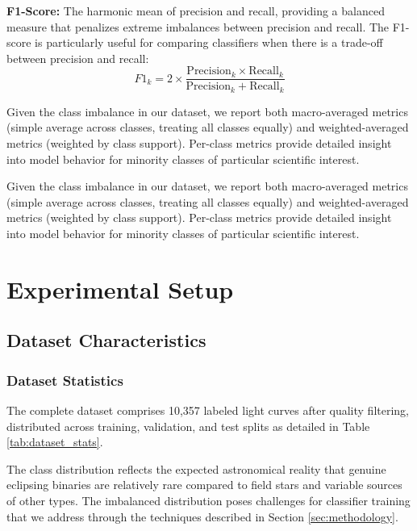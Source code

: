 \documentclass[11pt,a4paper]{article}
\begin{document}
\textbf{F1-Score:} The harmonic mean of precision and recall, providing a balanced measure that penalizes extreme imbalances between precision and recall. The F1-score is particularly useful for comparing classifiers when there is a trade-off between precision and recall:
\begin{equation}
    F1_k = 2 \times \frac{\text{Precision}_k \times \text{Recall}_k}{\text{Precision}_k + \text{Recall}_k}
\end{equation}

Given the class imbalance in our dataset, we report both macro-averaged metrics (simple average across classes, treating all classes equally) and weighted-averaged metrics (weighted by class support). Per-class metrics provide detailed insight into model behavior for minority classes of particular scientific interest.

Given the class imbalance in our dataset, we report both macro-averaged metrics (simple average across classes, treating all classes equally) and weighted-averaged metrics (weighted by class support). Per-class metrics provide detailed insight into model behavior for minority classes of particular scientific interest.

\section{Experimental Setup}\label{sec:experiments}

\subsection{Dataset Characteristics}

\subsubsection{Dataset Statistics}

The complete dataset comprises 10,357 labeled light curves after quality filtering, distributed across training, validation, and test splits as detailed in Table \ref{tab:dataset_stats}.

The class distribution reflects the expected astronomical reality that genuine eclipsing binaries are relatively rare compared to field stars and variable sources of other types. The imbalanced distribution poses challenges for classifier training that we address through the techniques described in Section \ref{sec:methodology}.
\end{document}
